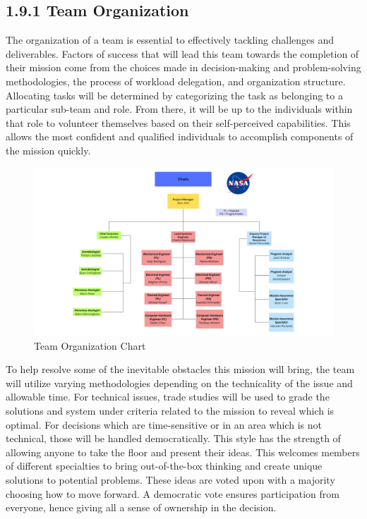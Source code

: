 \subsection*{1.9.1 Team Organization}


The organization of a team is essential to effectively tackling challenges and deliverables. Factors of success that will lead this team towards the completion of their mission come from the choices made in decision-making and problem-solving methodologies, the process of workload delegation, and organization structure.\\

Allocating tasks will be determined by categorizing the task as belonging to a particular sub-team and role. From there, it will be up to the individuals within that role to volunteer themselves based on their self-perceived capabilities. This allows the most confident and qualified individuals to accomplish components of the mission quickly.\\

\begin{figure}[H]
    \centering
    \includegraphics[width=1\textwidth]{images/orgchart.png}
    \caption{Team Organization Chart}
    \label{fig:orgchart}
\end{figure}

To help resolve some of the inevitable obstacles this mission will bring, the team will utilize varying methodologies depending on the technicality of the issue and allowable time. For technical issues, trade studies will be used to grade the solutions and system under criteria related to the mission to reveal which is optimal. For decisions which are time-sensitive or in an area which is not technical, those will be handled democratically. This style has the strength of allowing anyone to take the floor and present their ideas. This welcomes members of different specialties to bring out-of-the-box thinking and create unique solutions to potential problems. These ideas are voted upon with a majority choosing how to move forward. A democratic vote ensures participation from everyone, hence giving all a sense of ownership in the decision.\\

